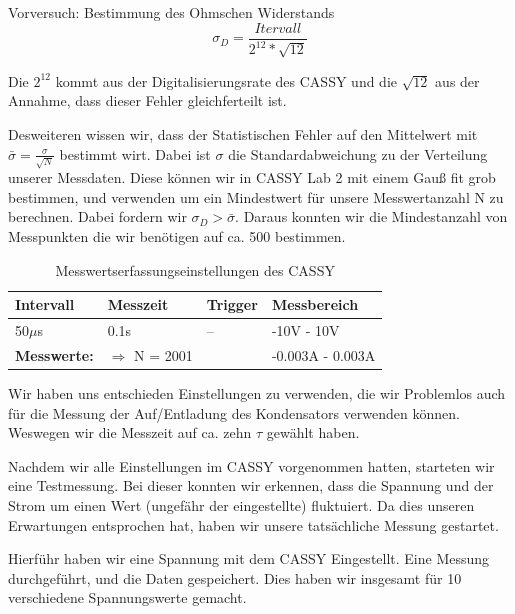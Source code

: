 \documentclass[twoside]{protokoll}
\begin{document}
\begin{aufgabe}{Vorversuch: Bestimmung des Ohmschen Widerstands}
 \begin{equation}
  \sigma_D = \frac{Itervall}{2^{12}*\sqrt{12}}
 \end{equation}
 
 Die $2^{12}$ kommt aus der Digitalisierungsrate des CASSY und die $\sqrt{12}$ aus der Annahme, dass dieser Fehler gleichferteilt ist. 
 
 Desweiteren wissen wir, dass der Statistischen Fehler auf den Mittelwert mit $ \bar{\sigma} = \frac{\sigma}{\sqrt{N}}$ bestimmt wirt.
 Dabei ist $\sigma$ die Standardabweichung zu der Verteilung unserer Messdaten.
 Diese können wir in CASSY Lab 2 mit einem Gauß fit grob bestimmen, und verwenden um ein Mindestwert für unsere Messwertanzahl N zu berechnen.
 Dabei fordern wir $\sigma_D > \bar{\sigma}$. Daraus konnten wir die Mindestanzahl von Messpunkten die wir benötigen auf ca. 500 bestimmen.
 
\begin{table}[H]
        \centering
        \begin{tabularx}{1\textwidth}{X X X X} %
            \toprule
            \textbf{Intervall} & \textbf{Messzeit} & \textbf{Trigger} & \textbf{Messbereich} \\
            \midrule
            50$\mu$s  & 0.1s & -- & -10V - 10V \\
            \textbf{Messwerte:}& $\Rightarrow$ N = 2001& & -0.003A - 0.003A\\
            \bottomrule
        \end{tabularx}
        \caption{Messwertserfassungseinstellungen des CASSY}
        \label{tab:mytable}
    \end{table}

Wir haben uns entschieden Einstellungen zu verwenden, die wir Problemlos auch für die Messung der Auf/Entladung des Kondensators verwenden können. Weswegen wir die Messzeit auf ca. zehn $\tau$ gewählt haben. 

Nachdem wir alle Einstellungen im CASSY vorgenommen hatten, starteten wir eine Testmessung. Bei dieser konnten wir erkennen, dass die Spannung und der Strom um einen Wert (ungefähr der eingestellte) fluktuiert. 
Da dies unseren Erwartungen entsprochen hat, haben wir unsere tatsächliche Messung gestartet. 

Hierführ haben wir eine Spannung mit dem CASSY Eingestellt. Eine Messung durchgeführt, und die Daten gespeichert. Dies haben wir insgesamt für 10 verschiedene Spannungswerte gemacht. \\


\end{aufgabe}
\end{document}
